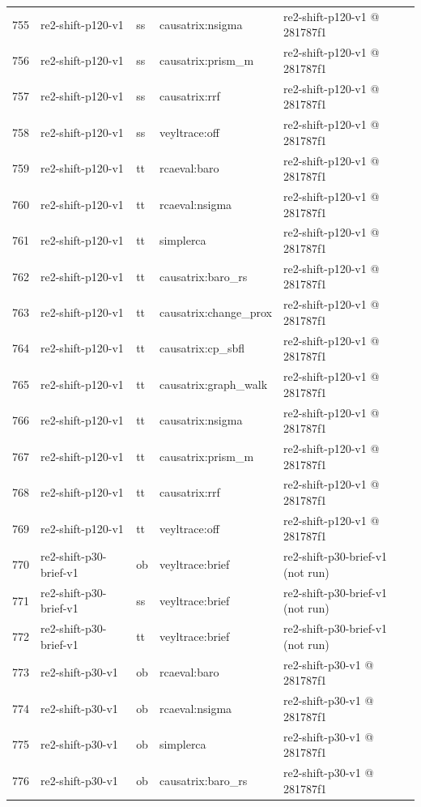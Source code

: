 \begin{longtable}{@{}r>{\raggedright\arraybackslash}p{87.0pt}>{\raggedright\arraybackslash}p{18.0pt}>{\raggedright\arraybackslash}p{63.0pt}>{\raggedright\arraybackslash}p{108.0pt}@{}}
755 & re2-shift-p120-v1 & ss & causatrix:nsigma & re2-shift-p120-v1 @ 281787f1 \\
756 & re2-shift-p120-v1 & ss & causatrix:prism\_m & re2-shift-p120-v1 @ 281787f1 \\
757 & re2-shift-p120-v1 & ss & causatrix:rrf & re2-shift-p120-v1 @ 281787f1 \\
758 & re2-shift-p120-v1 & ss & veyltrace:off & re2-shift-p120-v1 @ 281787f1 \\
759 & re2-shift-p120-v1 & tt & rcaeval:baro & re2-shift-p120-v1 @ 281787f1 \\
760 & re2-shift-p120-v1 & tt & rcaeval:nsigma & re2-shift-p120-v1 @ 281787f1 \\
761 & re2-shift-p120-v1 & tt & simplerca & re2-shift-p120-v1 @ 281787f1 \\
762 & re2-shift-p120-v1 & tt & causatrix:baro\_rs & re2-shift-p120-v1 @ 281787f1 \\
763 & re2-shift-p120-v1 & tt & causatrix:change\_prox & re2-shift-p120-v1 @ 281787f1 \\
764 & re2-shift-p120-v1 & tt & causatrix:cp\_sbfl & re2-shift-p120-v1 @ 281787f1 \\
765 & re2-shift-p120-v1 & tt & causatrix:graph\_walk & re2-shift-p120-v1 @ 281787f1 \\
766 & re2-shift-p120-v1 & tt & causatrix:nsigma & re2-shift-p120-v1 @ 281787f1 \\
767 & re2-shift-p120-v1 & tt & causatrix:prism\_m & re2-shift-p120-v1 @ 281787f1 \\
768 & re2-shift-p120-v1 & tt & causatrix:rrf & re2-shift-p120-v1 @ 281787f1 \\
769 & re2-shift-p120-v1 & tt & veyltrace:off & re2-shift-p120-v1 @ 281787f1 \\
770 & re2-shift-p30-brief-v1 & ob & veyltrace:brief & re2-shift-p30-brief-v1 (not run) \\
771 & re2-shift-p30-brief-v1 & ss & veyltrace:brief & re2-shift-p30-brief-v1 (not run) \\
772 & re2-shift-p30-brief-v1 & tt & veyltrace:brief & re2-shift-p30-brief-v1 (not run) \\
773 & re2-shift-p30-v1 & ob & rcaeval:baro & re2-shift-p30-v1 @ 281787f1 \\
774 & re2-shift-p30-v1 & ob & rcaeval:nsigma & re2-shift-p30-v1 @ 281787f1 \\
775 & re2-shift-p30-v1 & ob & simplerca & re2-shift-p30-v1 @ 281787f1 \\
776 & re2-shift-p30-v1 & ob & causatrix:baro\_rs & re2-shift-p30-v1 @ 281787f1 \\

\end{longtable}
